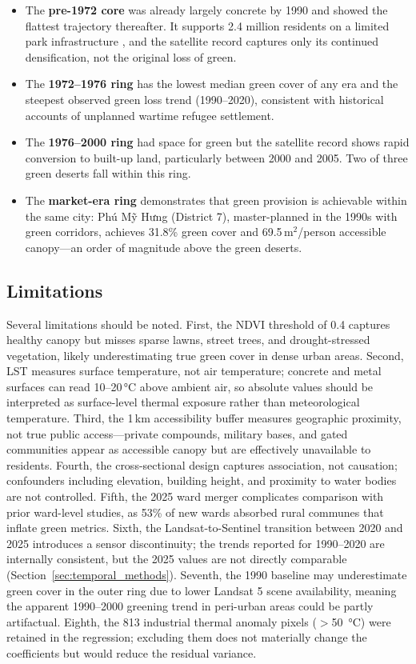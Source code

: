 \documentclass[preprint,12pt]{elsarticle}
\begin{document}
\begin{itemize}
    \item The \textbf{pre-1972 core} was already largely concrete by 1990 and showed the flattest trajectory thereafter. It supports 2.4 million residents on a limited park infrastructure \citep{gibert2018}, and the satellite record captures only its continued densification, not the original loss of green.
    \item The \textbf{1972--1976 ring} has the lowest median green cover of any era and the steepest observed green loss trend (1990--2020), consistent with historical accounts of unplanned wartime refugee settlement.
    \item The \textbf{1976--2000 ring} had space for green but the satellite record shows rapid conversion to built-up land, particularly between 2000 and 2005. Two of three green deserts fall within this ring.
    \item The \textbf{market-era ring} demonstrates that green provision is achievable within the same city: Phú Mỹ Hưng (District 7), master-planned in the 1990s with green corridors, achieves 31.8\% green cover and 69.5\,m$^2$/person accessible canopy---an order of magnitude above the green deserts.
\end{itemize}

\subsection{Limitations}

Several limitations should be noted. First, the NDVI threshold of 0.4 captures healthy canopy but misses sparse lawns, street trees, and drought-stressed vegetation, likely underestimating true green cover in dense urban areas. Second, LST measures surface temperature, not air temperature; concrete and metal surfaces can read 10--20\,\si{\degreeCelsius} above ambient air, so absolute values should be interpreted as surface-level thermal exposure rather than meteorological temperature. Third, the 1\,km accessibility buffer measures geographic proximity, not true public access---private compounds, military bases, and gated communities appear as accessible canopy but are effectively unavailable to residents. Fourth, the cross-sectional design captures association, not causation; confounders including elevation, building height, and proximity to water bodies are not controlled. Fifth, the 2025 ward merger complicates comparison with prior ward-level studies, as 53\% of new wards absorbed rural communes that inflate green metrics. Sixth, the Landsat-to-Sentinel transition between 2020 and 2025 introduces a sensor discontinuity; the trends reported for 1990--2020 are internally consistent, but the 2025 values are not directly comparable (Section~\ref{sec:temporal_methods}). Seventh, the 1990 baseline may underestimate green cover in the outer ring due to lower Landsat 5 scene availability, meaning the apparent 1990--2000 greening trend in peri-urban areas could be partly artifactual. Eighth, the 813 industrial thermal anomaly pixels ($>$\SI{50}{\degreeCelsius}) were retained in the regression; excluding them does not materially change the coefficients but would reduce the residual variance.
\end{document}
